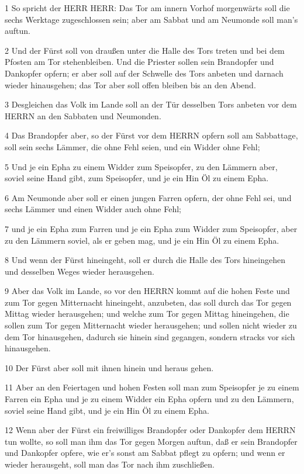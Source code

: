 \par 1 So spricht der HERR HERR: Das Tor am innern Vorhof morgenwärts soll die sechs Werktage zugeschlossen sein; aber am Sabbat und am Neumonde soll man's auftun.
\par 2 Und der Fürst soll von draußen unter die Halle des Tors treten und bei dem Pfosten am Tor stehenbleiben. Und die Priester sollen sein Brandopfer und Dankopfer opfern; er aber soll auf der Schwelle des Tors anbeten und darnach wieder hinausgehen; das Tor aber soll offen bleiben bis an den Abend.
\par 3 Desgleichen das Volk im Lande soll an der Tür desselben Tors anbeten vor dem HERRN an den Sabbaten und Neumonden.
\par 4 Das Brandopfer aber, so der Fürst vor dem HERRN opfern soll am Sabbattage, soll sein sechs Lämmer, die ohne Fehl seien, und ein Widder ohne Fehl;
\par 5 Und je ein Epha zu einem Widder zum Speisopfer, zu den Lämmern aber, soviel seine Hand gibt, zum Speisopfer, und je ein Hin Öl zu einem Epha.
\par 6 Am Neumonde aber soll er einen jungen Farren opfern, der ohne Fehl sei, und sechs Lämmer und einen Widder auch ohne Fehl;
\par 7 und je ein Epha zum Farren und je ein Epha zum Widder zum Speisopfer, aber zu den Lämmern soviel, als er geben mag, und je ein Hin Öl zu einem Epha.
\par 8 Und wenn der Fürst hineingeht, soll er durch die Halle des Tors hineingehen und desselben Weges wieder herausgehen.
\par 9 Aber das Volk im Lande, so vor den HERRN kommt auf die hohen Feste und zum Tor gegen Mitternacht hineingeht, anzubeten, das soll durch das Tor gegen Mittag wieder herausgehen; und welche zum Tor gegen Mittag hineingehen, die sollen zum Tor gegen Mitternacht wieder herausgehen; und sollen nicht wieder zu dem Tor hinausgehen, dadurch sie hinein sind gegangen, sondern stracks vor sich hinausgehen.
\par 10 Der Fürst aber soll mit ihnen hinein und heraus gehen.
\par 11 Aber an den Feiertagen und hohen Festen soll man zum Speisopfer je zu einem Farren ein Epha und je zu einem Widder ein Epha opfern und zu den Lämmern, soviel seine Hand gibt, und je ein Hin Öl zu einem Epha.
\par 12 Wenn aber der Fürst ein freiwilliges Brandopfer oder Dankopfer dem HERRN tun wollte, so soll man ihm das Tor gegen Morgen auftun, daß er sein Brandopfer und Dankopfer opfere, wie er's sonst am Sabbat pflegt zu opfern; und wenn er wieder herausgeht, soll man das Tor nach ihm zuschließen.
